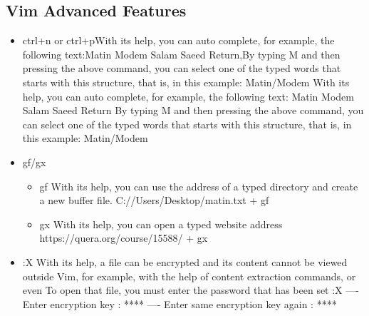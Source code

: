 \documentclass[12pt]{article}
\begin{document}
\subsection{Vim Advanced Features}
\begin{itemize}
  \item ctrl+n   or  ctrl+p\newline With its help, you can auto complete, for example, the following text:\newline Matin Modem Salam Saeed Return,By typing {M} and then pressing the above command, you can select one of the typed words that starts with this structure, that is, in this example:\newline
  Matin/Modem\newline
  With its help, you can auto complete, for example, the following text:\newline
Matin Modem Salam Saeed Return
By typing {M} and then pressing the above command, you can select one of the typed words that starts with this structure, that is, in this example:
Matin/Modem
  \item gf/gx
      \begin{itemize}
        \item gf
        With its help, you can use the address of a typed directory and create a new buffer file.\newline
        C://Users/Desktop/matin.txt + {gf}
        \item gx
        With its help, you can open a typed website address\newline
        https://quera.org/course/15588/ + {gx}
      \end{itemize}



  \item :X\newline
  With its help, a file can be encrypted and its content cannot be viewed outside Vim, for example, with the help of content extraction commands, or even
  To open that file, you must enter the password that has been set\newline
  :X    ----   Enter encryption key : ****   ----  Enter same encryption key again : ****
\end{itemize}
\end{document}
